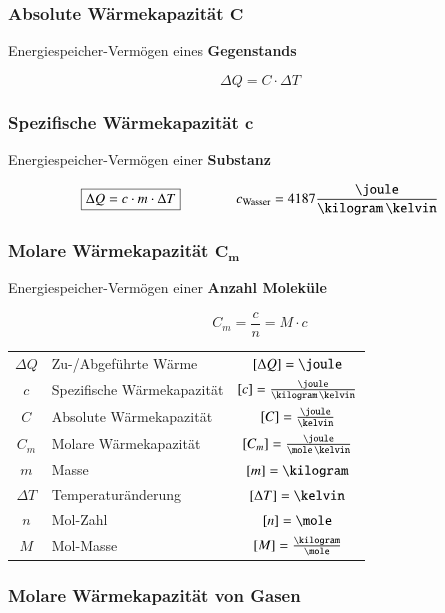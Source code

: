 \subsubsection{Absolute Wärmekapazität $\bm{C}$}

Energiespeicher-Vermögen eines \textbf{Gegenstands}

$$ \boxed{ \Delta Q = C \cdot \Delta T } $$


\subsubsection{Spezifische Wärmekapazität $\bm{c}$}

Energiespeicher-Vermögen einer \textbf{Substanz}

$$ \boxed{ \Delta Q = c \cdot m \cdot \Delta T } \qquad \qquad c_{\rm Wasser} = 4187 \frac{\joule}{\kilogram \, \kelvin} $$


\subsubsection{Molare Wärmekapazität $\bm {C_m}$}

Energiespeicher-Vermögen einer \textbf{Anzahl Moleküle}

$$ \boxed{ C_m = \frac{c}{n} = M \cdot c } $$

\renewcommand{\arraystretch}{1.3}
\begin{tabular}{c l c}
	$\Delta Q$	& Zu-/Abgeführte Wärme 			& $[\Delta Q] = \joule$ 						\\
	$c$ 		& Spezifische Wärmekapazität 	& $[c] = \frac{\joule}{\kilogram \, \kelvin}$ 	\\
	$C$ 		& Absolute Wärmekapazität 		& $[C] = \frac{\joule}{\kelvin}$ 				\\
	$C_m$ 		& Molare Wärmekapazität 		& $[C_m] = \frac{\joule}{\mole \, \kelvin}$ 	\\
	$m$ 		& Masse 						& $[m] = \kilogram$ 							\\
	$\Delta T$ 	& Temperaturänderung 			& $[\Delta T] = \kelvin$ 						\\
	$n$ 		& Mol-Zahl 						& $[n] = \mole$ 								\\
	$M$ 		& Mol-Masse 					& $[M] = \frac{\kilogram}{\mole}$
\end{tabular}
\renewcommand{\arraystretch}{1}


\subsubsection{Molare Wärmekapazität von Gasen}

